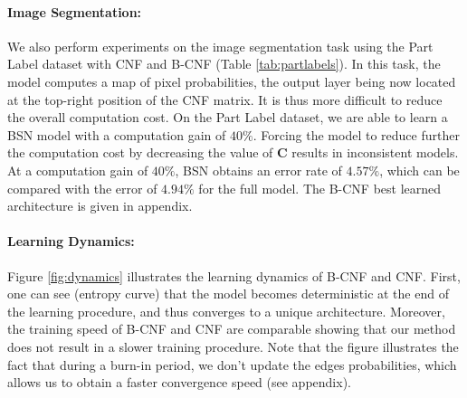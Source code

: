 \documentclass[10pt,twocolumn,letterpaper]{article}
\begin{document}
\paragraph{Image Segmentation: }



We also perform experiments on the image segmentation task using the Part Label dataset with CNF and B-CNF (Table \ref{tab:partlabels}). In this task, the model computes a map of pixel probabilities, the output layer being now located at the top-right position of the CNF matrix. It is thus more difficult to reduce the overall computation cost. On the Part Label dataset, we are able to learn a BSN model with a computation gain of $40\%$. Forcing the model to reduce further the computation cost by decreasing the value of $\mathbf{C}$ results in inconsistent models. At a computation gain of $40 \%$, BSN obtains an error rate of $4.57 \%$, which can be compared with the error of $4.94\%$ for the full model. The B-CNF best learned architecture is given in appendix.
\vspace{-0.2cm}
\paragraph{Learning Dynamics: }


Figure \ref{fig:dynamics} illustrates the learning dynamics of B-CNF and CNF. First, one can see (entropy curve) that the model becomes deterministic at the end of the learning procedure, and thus converges to a unique architecture. Moreover, the training speed of B-CNF and CNF are comparable showing that our method does not result in a slower training procedure. Note that the figure illustrates the fact that during a burn-in period, we don't update the edges probabilities, which allows us to obtain a faster convergence speed (see appendix).


\end{document}
